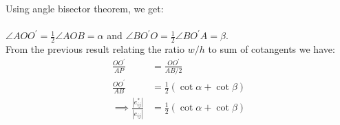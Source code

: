 \documentclass{article}
\newcommand\ifrac[2]{{\displaystyle\frac{#1}{#2}}}
\def\hal{\ifrac{1}{2}}
\begin{document}
Using angle bisector theorem, we get:\\\\
$\angle AOO^\prime = \hal \angle AOB = \alpha$ and $\angle BO^\prime O = \hal \angle BO^\prime A = \beta$.\\

From the previous result relating the ratio $w/h$ to sum of cotangents we have:
\begin{align*}
    \frac{OO^\prime}{AP} &= \frac{OO^\prime}{AB/2} \\
    \frac{OO^\prime}{AB} &= \hal (\cot\alpha + \cot\beta) \\
    \implies \frac{|e^*_{ij}|}{|e_{ij}|} &= \hal (\cot\alpha + \cot\beta)
\end{align*}
\end{document}
